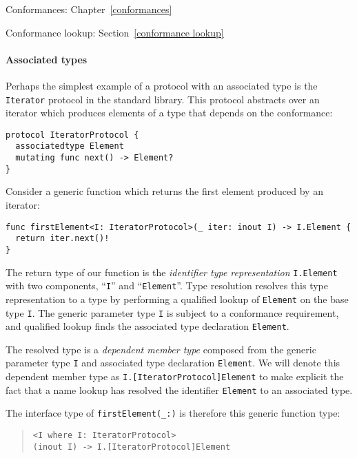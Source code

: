 \documentclass[a4paper,headsepline,bibliography=totoc,toc=flat,fleqn,twoside=semi]{scrbook}
\theoremstyle{definition}
\theoremstyle{definition}
\theoremstyle{definition}
\begin{document}
\begin{MoreDetails}
\item Conformances: Chapter~\ref{conformances}
\item Conformance lookup: Section~\ref{conformance lookup}
\end{MoreDetails}

\paragraph{Associated types} Perhaps the simplest example of a protocol with an associated type is the \texttt{Iterator} protocol in the standard library. This protocol abstracts over an iterator which produces elements of a type that depends on the conformance:
\begin{Verbatim}
protocol IteratorProtocol {
  associatedtype Element
  mutating func next() -> Element?
}
\end{Verbatim}
Consider a generic function which returns the first element produced by an iterator:
\begin{Verbatim}
func firstElement<I: IteratorProtocol>(_ iter: inout I) -> I.Element {
  return iter.next()!
}
\end{Verbatim}
The return type of our function is the \emph{identifier type representation} \texttt{I.Element} with two components, ``\texttt{I}'' and ``\texttt{Element}''. Type resolution resolves this type representation to a type by performing a qualified lookup of \texttt{Element} on the base type \texttt{I}. The generic parameter type \texttt{I} is subject to a conformance requirement, and qualified lookup finds the associated type declaration \texttt{Element}.

The resolved type is a \emph{dependent member type} composed from the generic parameter type \texttt{I} and associated type declaration \texttt{Element}. We will denote this dependent member type as \verb|I.[IteratorProtocol]Element| to make explicit the fact that a name lookup has resolved the identifier \texttt{Element} to an associated type.

The interface type of \verb|firstElement(_:)| is therefore this generic function type:
\begin{quote}
\begin{verbatim}
<I where I: IteratorProtocol>
(inout I) -> I.[IteratorProtocol]Element
\end{verbatim}
\end{quote}
\end{document}
